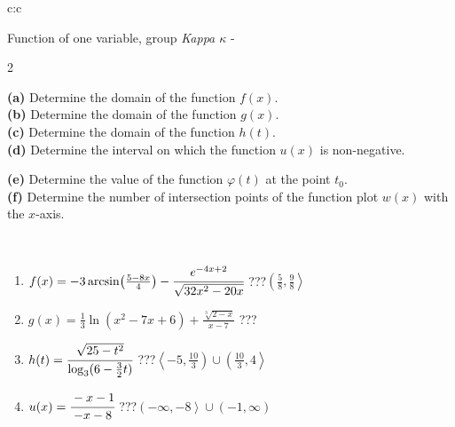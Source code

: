 \documentclass[10pt]{report}
\begin{document}
\begin{tabular}{c:c}
\begin{minipage}[c][104.5mm][t]{0.5\linewidth}
\begin{center}
\vspace{7mm}
{\huge Function of one variable, group \textit{Kappa $\kappa$} -}\\[5mm]
\begin{minipage}{0.95\linewidth}
\begin{center}
{\small \begin{multicols}{2} \raggedright
\textbf{(a)} Determine the domain of the function \(f(x)\). \\[1mm]
\textbf{(b)} Determine the domain of the function \(g(x)\). \\[1mm]
\textbf{(c)} Determine the domain of the function \(h(t)\). \\[1mm]
\textbf{(d)} Determine the interval on which the function \(u(x)\) is non-negative. \par \columnbreak
\textbf{(e)} Determine the value of the function \(\varphi(t)\) at the point \(t_0\). \\[1mm]
\textbf{(f)} Determine the number of intersection points of the function plot \(w(x)\) with the \(x\)-axis. \\[1mm]
\end{multicols}
}
\end{center}
\end{minipage}
\\[4mm]
\begin{minipage}{0.79\linewidth}
\begin{center}
\begin{varwidth}{\linewidth}
\begin{enumerate}
\small
\item $f(x) = -3\arcsin\!\left( \frac{5-8x}{4} \right) - \cfrac{e^{-4x+2}}{\sqrt{32x^2-20x}}$\quad \dotfill\; ???\;\dotfill \quad $\left(\frac{5}{8} , \frac{9}{8}\right\rangle$
\item $g(x) = \frac{1}{3} \ln{\!(x^2-7x+6)}+\frac{\sqrt[3]{2-x}}{x-7}$\quad \dotfill\; ???\;\dotfill {}
\item $h(t) = \cfrac{\sqrt{25-t^2}}{\log_3(6-\frac{3}{2}t)}$\quad \dotfill\; ???\;\dotfill \quad $\left\langle-5 , \frac{10}{3}\right)\cup\left(\frac{10}{3} , 4\right\rangle$
\item $u(x) = \cfrac{-x-1}{-x-8}$\quad \dotfill\; ???\;\dotfill \quad $\left(-\infty , -8\right\rangle\cup\left(-1 , \infty\right)$

\end{enumerate}
\end{varwidth}
\end{center}
\end{minipage}
\end{center}
\end{minipage}
\end{tabular}
\end{document}
